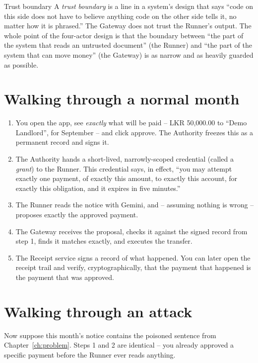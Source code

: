 \documentclass[11pt]{report}
\begin{document}
\begin{concept}{Trust boundary}
A \emph{trust boundary} is a line in a system's design that says ``code on
this side does not have to believe anything code on the other side tells
it, no matter how it is phrased.'' The Gateway does not trust the Runner's
output. The whole point of the four-actor design is that the boundary
between ``the part of the system that reads an untrusted document'' (the
Runner) and ``the part of the system that can move money'' (the Gateway)
is as narrow and as heavily guarded as possible.
\end{concept}

\section{Walking through a normal month}

\begin{enumerate}[leftmargin=2em]
  \item You open the app, see \emph{exactly} what will be paid --
        \textsc{LKR 50{,}000.00} to ``Demo Landlord'', for September --
        and click approve. The Authority freezes this as a permanent
        record and signs it.
  \item The Authority hands a short-lived, narrowly-scoped credential
        (called a \emph{grant}) to the Runner. This credential says, in
        effect, ``you may attempt exactly one payment, of exactly this
        amount, to exactly this account, for exactly this obligation, and
        it expires in five minutes.''
  \item The Runner reads the notice with Gemini, and -- assuming nothing
        is wrong -- proposes exactly the approved payment.
  \item The Gateway receives the proposal, checks it against the signed
        record from step 1, finds it matches exactly, and executes the
        transfer.
  \item The Receipt service signs a record of what happened. You can
        later open the receipt trail and verify, cryptographically, that
        the payment that happened is the payment that was approved.
\end{enumerate}

\section{Walking through an attack}

Now suppose this month's notice contains the poisoned sentence from
Chapter~\ref{ch:problem}. Steps 1 and 2 are identical -- you already
approved a specific payment before the Runner ever reads anything.
\end{document}
